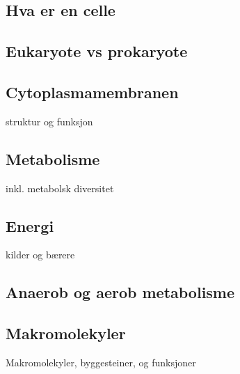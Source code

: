 \subsection{Hva er en celle}

\subsection{Eukaryote vs prokaryote}

\subsection{Cytoplasmamembranen}
    struktur og funksjon

\subsection{Metabolisme}
    inkl. metabolsk diversitet

\subsection{Energi}
    kilder og bærere

\subsection{Anaerob og aerob metabolisme}

\subsection{Makromolekyler}
    Makromolekyler, byggesteiner, og funksjoner
   